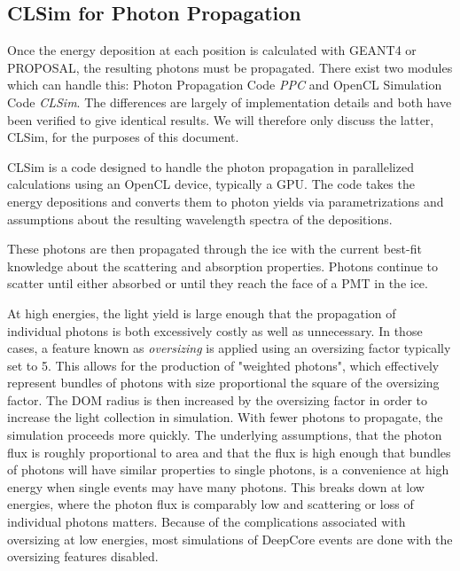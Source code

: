 \subsection{CLSim for Photon Propagation}
\label{subsec:clsim}
Once the energy deposition at each position is calculated with GEANT4 or PROPOSAL, the resulting photons must be propagated. 
There exist two modules which can handle this: Photon Propagation Code \emph{PPC} and OpenCL Simulation Code \emph{CLSim}. 
The differences are largely of implementation details and both have been verified to give identical results.
We will therefore only discuss the latter, CLSim, for the purposes of this document.

CLSim is a code designed to handle the photon propagation in parallelized calculations using an OpenCL device, typically a GPU.
The code takes the energy depositions and converts them to photon yields via parametrizations and assumptions about the resulting wavelength spectra of the depositions.

These photons are then propagated through the ice with the current best-fit knowledge about the scattering and absorption properties. 
Photons continue to scatter until either absorbed or until they reach the face of a PMT in the ice.

At high energies, the light yield is large enough that the propagation of individual photons is both excessively costly as well as unnecessary.
In those cases, a feature known as \emph{oversizing} is applied using an oversizing factor typically set to 5.
This allows for the production of "weighted photons", which effectively represent bundles of photons with size proportional the square of the oversizing factor.
The DOM radius is then increased by the oversizing factor in order to increase the light collection in simulation.
With fewer photons to propagate, the simulation proceeds more quickly. 
The underlying assumptions, that the photon flux is roughly proportional to area and that the flux is high enough that bundles of photons will have similar properties to single photons, is a convenience at high energy when single events may have many photons.
This breaks down at low energies, where the photon flux is comparably low and scattering or loss of individual photons matters.
Because of the complications associated with oversizing at low energies, most simulations of DeepCore events are done with the oversizing features disabled.

